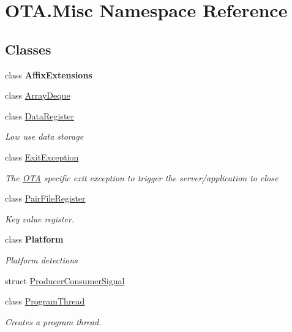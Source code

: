 \hypertarget{namespace_o_t_a_1_1_misc}{}\section{O\+T\+A.\+Misc Namespace Reference}
\label{namespace_o_t_a_1_1_misc}
\subsection*{Classes}
\begin{DoxyCompactItemize}
\item 
class {\bfseries Affix\+Extensions}
\item 
class \hyperlink{class_o_t_a_1_1_misc_1_1_array_deque}{Array\+Deque}
\item 
class \hyperlink{class_o_t_a_1_1_misc_1_1_data_register}{Data\+Register}
\begin{DoxyCompactList}\small\item\em Low use data storage \end{DoxyCompactList}\item 
class \hyperlink{class_o_t_a_1_1_misc_1_1_exit_exception}{Exit\+Exception}
\begin{DoxyCompactList}\small\item\em The \hyperlink{namespace_o_t_a}{O\+T\+A} specific exit exception to trigger the server/application to close \end{DoxyCompactList}\item 
class \hyperlink{class_o_t_a_1_1_misc_1_1_pair_file_register}{Pair\+File\+Register}
\begin{DoxyCompactList}\small\item\em Key value register. \end{DoxyCompactList}\item 
class {\bfseries Platform}
\begin{DoxyCompactList}\small\item\em Platform detections \end{DoxyCompactList}\item 
struct \hyperlink{struct_o_t_a_1_1_misc_1_1_producer_consumer_signal}{Producer\+Consumer\+Signal}
\item 
class \hyperlink{class_o_t_a_1_1_misc_1_1_program_thread}{Program\+Thread}
\begin{DoxyCompactList}\small\item\em Creates a program thread. \end{DoxyCompactList}\item 

\end{DoxyCompactItemize}
